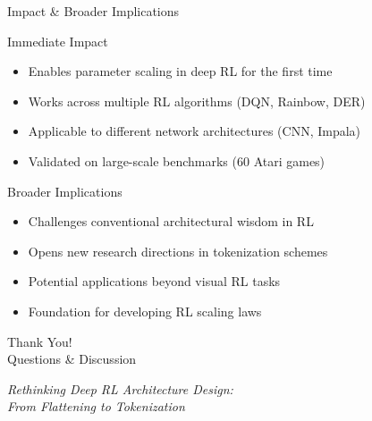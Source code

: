 \documentclass{beamer}
\begin{document}
\begin{frame}{Impact \& Broader Implications}
  \begin{block}{Immediate Impact}
    \begin{itemize}
      \item Enables parameter scaling in deep RL for the first time
      \item Works across multiple RL algorithms (DQN, Rainbow, DER)
      \item Applicable to different network architectures (CNN, Impala)
      \item Validated on large-scale benchmarks (60 Atari games)
    \end{itemize}
  \end{block}
  
  \begin{block}{Broader Implications}
    \begin{itemize}
      \item Challenges conventional architectural wisdom in RL
      \item Opens new research directions in tokenization schemes
      \item Potential applications beyond visual RL tasks
      \item Foundation for developing RL scaling laws
    \end{itemize}
  \end{block}
\end{frame}

\begin{frame}
  \begin{center}
    \Huge Thank You!\\
    \vspace{1em}
    \Large Questions \& Discussion
  \end{center}
  
  \vspace{2em}
  \begin{center}
    \textit{Rethinking Deep RL Architecture Design:\\
    From Flattening to Tokenization}
  \end{center}
\end{frame}
\end{document}
